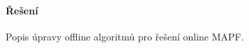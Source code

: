 \paragraph{Řešení~}\label{par:reseni_online_mapf}



Popis úpravy offline algoritmů pro řešení online MAPF\@.

%
%
%
